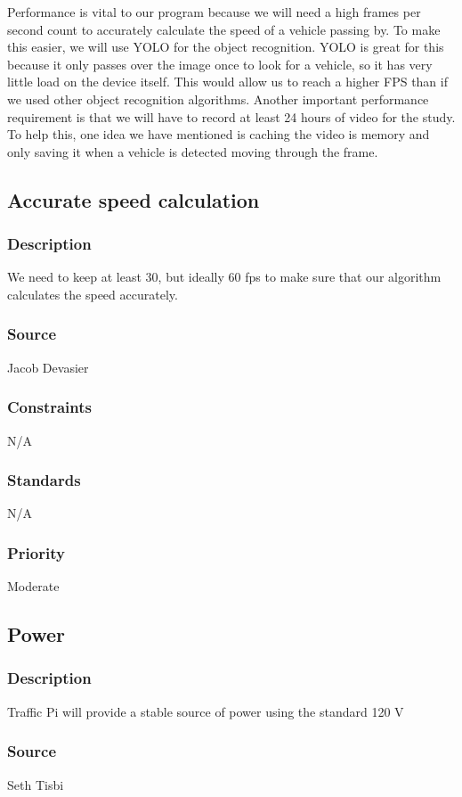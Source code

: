 Performance is vital to our program because we will need a high frames per second count to accurately calculate the speed of a vehicle passing by. To make this easier, we will use YOLO for the object recognition. YOLO is great for this because it only passes over the image once to look for a vehicle, so it has very little load on the device itself. This would allow us to reach a higher FPS than if we used other object recognition algorithms. Another important performance requirement is that we will have to record at least 24 hours of video for the study. To help this, one idea we have mentioned is caching the video is memory and only saving it when a vehicle is detected moving through the frame.

\subsection{Accurate speed calculation}
\subsubsection{Description}
We need to keep at least 30, but ideally 60 fps to make sure that our algorithm calculates the speed accurately.
\subsubsection{Source}
Jacob Devasier
\subsubsection{Constraints}
N/A
\subsubsection{Standards}
N/A
\subsubsection{Priority}
Moderate

\subsection{Power}
\subsubsection{Description}
Traffic Pi will provide a stable source of power using the standard 120 V
\subsubsection{Source}
Seth Tisbi
